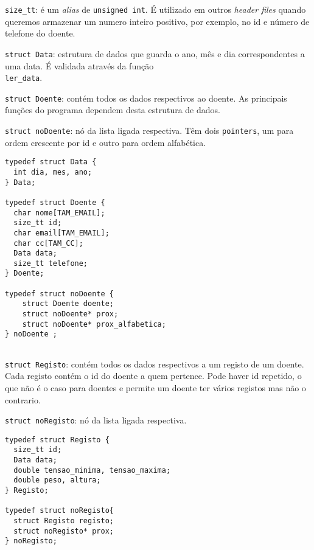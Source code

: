 \documentclass[a4paper, 12pt]{article}
\newcommand\code[1]{\texttt{\sloppy #1}}
\begin{document}
\begin{paracol}{2}
    \code{size\_tt}: é um \textit{alias} de \code{unsigned int}. É utilizado em outros \textit{header files} quando queremos armazenar um numero inteiro positivo, por exemplo, no id e número de telefone do doente.

    \code{struct Data}: estrutura de dados que guarda o ano, mês e dia correspondentes a uma data. É validada através da função\\ \code{ler\_data}.

    \code{struct Doente}: contém todos os dados respectivos ao doente. As principais funções do programa dependem desta estrutura de dados.

    \code{struct noDoente}: nó da lista ligada respectiva. Têm dois \code{pointers}, um para ordem crescente por id e outro para ordem alfabética.



    \switchcolumn

    \vspace{-1em}
\begin{verbatim}
typedef struct Data {
  int dia, mes, ano;
} Data;

typedef struct Doente {
  char nome[TAM_EMAIL];
  size_tt id;
  char email[TAM_EMAIL];
  char cc[TAM_CC];
  Data data;       
  size_tt telefone;
} Doente;

typedef struct noDoente {
    struct Doente doente;
    struct noDoente* prox;
    struct noDoente* prox_alfabetica;
} noDoente ;


\end{verbatim}
\end{paracol}
\vspace{-3em}

\begin{paracol}{2}
    \code{struct Registo}: contém todos os dados respectivos a um registo de um doente. Cada registo contém o id do doente a quem pertence. Pode haver id repetido, o que não é o caso para doentes e permite um doente ter vários registos mas não o contrario. 

    \code{struct noRegisto}: nó da lista ligada respectiva. 



    \switchcolumn

    \vspace{-1em}
\begin{verbatim}
typedef struct Registo {
  size_tt id;
  Data data; 
  double tensao_minima, tensao_maxima;
  double peso, altura;
} Registo;

typedef struct noRegisto{
  struct Registo registo;
  struct noRegisto* prox;
} noRegisto;
\end{verbatim}

\end{paracol}
\end{document}
